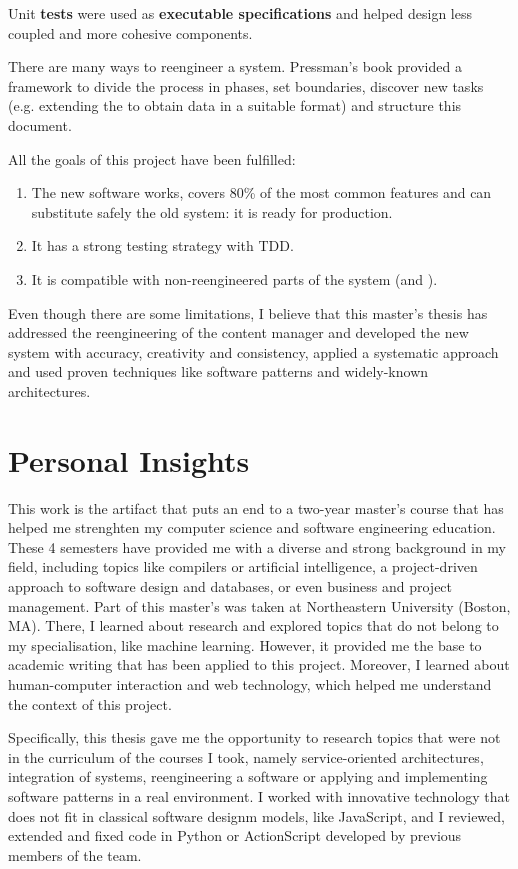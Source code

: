 Unit \textbf{tests} were used as \textbf{executable specifications} and helped design less coupled and more cohesive components.

There are many ways to reengineer a system.
Pressman's book provided a framework to divide the process in phases, set boundaries, discover new tasks (e.g. extending the \flangobe to obtain data in a suitable format) and structure this document.

All the goals of this project have been fulfilled:
\begin{enumerate}
\item The new software works, covers 80\% of the most common features and can substitute safely the old \flash system: it is ready for production.
\item It has a strong testing strategy with \ac{TDD}.
\item It is compatible with non-reengineered parts of the system (\flangobe and \flangofe).
\end{enumerate}

Even though there are some limitations, I believe that this master's thesis has addressed the reengineering of the content manager and developed the new system with accuracy, creativity and consistency, applied a systematic approach and used proven techniques like software patterns and widely-known architectures.


\section{Personal Insights}
This work is the artifact that puts an end to a two-year master's course that has helped me strenghten my computer science and software engineering education.
These 4 semesters have provided me with a diverse and strong background in my field, including topics like compilers or artificial intelligence, a project-driven approach to software design and databases, or even business and project management.
Part of this master's was taken at Northeastern University (Boston, MA).
There, I learned about research and explored topics that do not belong to my specialisation, like machine learning.
However, it provided me the base to academic writing that has been applied to this project.
Moreover, I learned about human-computer interaction and web technology, which helped me understand the context of this project.

Specifically, this thesis gave me the opportunity to research topics that were not in the curriculum of the courses I took, namely service-oriented architectures, integration of systems, reengineering a software or applying and implementing software patterns in a real environment.
I worked with innovative technology that does not fit in classical software designm models, like JavaScript, and I reviewed, extended and fixed code in Python or ActionScript developed by previous members of the team.

